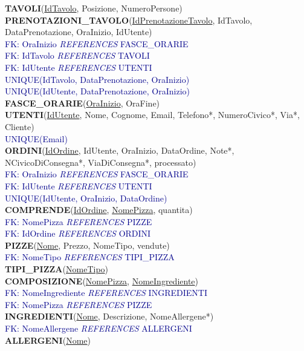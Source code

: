 \documentclass[a4paper,12pt, oneside]{article}
\begin{document}
\textbf{TAVOLI}(\underline{IdTavolo}, Posizione, NumeroPersone) \\
\textbf{PRENOTAZIONI\_TAVOLO}(\underline{IdPrenotazioneTavolo}, IdTavolo, DataPrenotazione, OraInizio, IdUtente) \\
\textcolor{darkBlue}{FK: OraInizio \textit{REFERENCES} FASCE\_ORARIE} \\
\textcolor{darkBlue}{FK: IdTavolo \textit{REFERENCES} TAVOLI} \\
\textcolor{darkBlue}{FK: IdUtente \textit{REFERENCES} UTENTI} \\
\textcolor{darkBlue}{UNIQUE(IdTavolo, DataPrenotazione, OraInizio)} \\
\textcolor{darkBlue}{UNIQUE(IdUtente, DataPrenotazione, OraInizio)} \\
\textbf{FASCE\_ORARIE}(\underline{OraInizio}, OraFine) \\
\textbf{UTENTI}(\underline{IdUtente}, Nome, Cognome, Email, Telefono*, NumeroCivico*, Via*, Cliente) \\
\textcolor{darkBlue}{UNIQUE(Email)} \\
\textbf{ORDINI}(\underline{IdOrdine}, IdUtente, OraInizio, DataOrdine, Note*, NCivicoDiConsegna*, ViaDiConsegna*, processato) \\
\textcolor{darkBlue}{FK: OraInizio \textit{REFERENCES} FASCE\_ORARIE} \\
\textcolor{darkBlue}{FK: IdUtente \textit{REFERENCES} UTENTI} \\
\textcolor{darkBlue}{UNIQUE(IdUtente, OraInizio, DataOrdine)} \\
\textbf{COMPRENDE}(\underline{IdOrdine}, \underline{NomePizza}, quantita) \\
\textcolor{darkBlue}{FK: NomePizza \textit{REFERENCES} PIZZE} \\
\textcolor{darkBlue}{FK: IdOrdine \textit{REFERENCES} ORDINI} \\
\textbf{PIZZE}(\underline{Nome}, Prezzo, NomeTipo, vendute) \\
\textcolor{darkBlue}{FK: NomeTipo \textit{REFERENCES} TIPI\_PIZZA} \\
\textbf{TIPI\_PIZZA}(\underline{NomeTipo}) \\
\textbf{COMPOSIZIONE}(\underline{NomePizza}, \underline{NomeIngrediente}) \\
\textcolor{darkBlue}{FK: NomeIngrediente \textit{REFERENCES} INGREDIENTI} \\
\textcolor{darkBlue}{FK: NomePizza \textit{REFERENCES} PIZZE} \\
\textbf{INGREDIENTI}(\underline{Nome}, Descrizione, NomeAllergene*) \\
\textcolor{darkBlue}{FK: NomeAllergene \textit{REFERENCES} ALLERGENI} \\
\textbf{ALLERGENI}(\underline{Nome})
\end{document}
